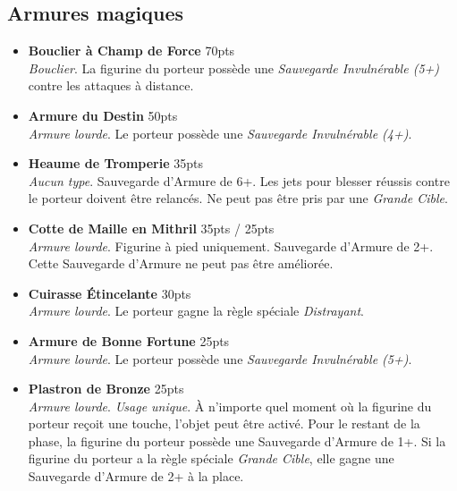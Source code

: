 \newpage

\subsection{Armures magiques}

\begin{multicols}{2}
\begin{itemize}[label={-}]
\item \textbf{Bouclier à Champ de Force} \dotfill \unit{70}{pts} \\
\emph{Bouclier}. La figurine du porteur possède une \emph{Sauvegarde Invulnérable (5+)} contre les attaques à distance.

\item \textbf{Armure du Destin} \dotfill \unit{50}{pts} \\
\emph{Armure lourde}. Le porteur possède une \emph{Sauvegarde Invulnérable (4+)}.

\item \textbf{Heaume de Tromperie} \dotfill \unit{35}{pts} \\
\emph{Aucun type}. Sauvegarde d'Armure de 6+. Les jets pour blesser réussis contre le porteur doivent être relancés. Ne peut pas être pris par une \emph{Grande Cible}.

\item \textbf{Cotte de Maille en Mithril} \dotfill \unit{35}{pts} / \unit{25}{pts} \\
\emph{Armure lourde}. Figurine à pied uniquement. Sauvegarde d'Armure de 2+. Cette Sauvegarde d'Armure ne peut pas être améliorée.

\item \textbf{Cuirasse Étincelante} \dotfill \unit{30}{pts} \\
\emph{Armure lourde}. Le porteur gagne la règle spéciale \emph{Distrayant}.

\item \textbf{Armure de Bonne Fortune} \dotfill \unit{25}{pts} \\
\emph{Armure lourde}. Le porteur possède une \emph{Sauvegarde Invulnérable (5+)}.

\item \textbf{Plastron de Bronze} \dotfill \unit{25}{pts} \\
\emph{Armure lourde}. \emph{Usage unique}. À n'importe quel moment où la figurine du porteur reçoit une touche, l'objet peut être activé. Pour le restant de la phase, la figurine du porteur possède une Sauvegarde d'Armure de 1+. Si la figurine du porteur a la règle spéciale \emph{Grande Cible}, elle gagne une Sauvegarde d'Armure de 2+ à la place.


\end{itemize}
\end{multicols}
